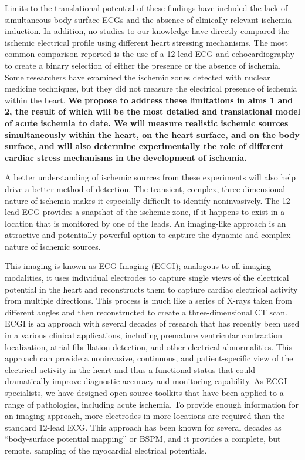 Limits to the translational potential of these findings have included the
lack of simultaneous body-surface ECGs and the absence of clinically
relevant ischemia induction. In addition, no studies to our knowledge have
directly compared the ischemic electrical profile using different heart
stressing mechanisms. The most common comparison reported is the use of a
12-lead ECG and echocardiography to create a binary selection of either the
presence or the absence of
ischemia.\cite{BLZ:Sha1998a,BLZ:Dho2000,BLZ:Mai1994} Some researchers have
examined the ischemic zones detected with nuclear medicine techniques, but
they did not measure the electrical presence of ischemia within the
heart.\cite{BLZ:San1998} \textbf{We propose to address these limitations in
  aims 1 and 2, the result of which will be the most detailed and
  translational model of acute ischemia to date. We will measure realistic
  ischemic sources simultaneously within the heart, on the heart surface,
  and on the body surface, and will also determine experimentally the role
  of different cardiac stress mechanisms in the development of ischemia.}

A better understanding of ischemic sources from these experiments will also
help drive a better method of detection. The transient, complex,
three-dimensional nature of ischemia makes it especially difficult to
identify noninvasively. The 12-lead ECG provides a snapshot of the ischemic
zone, if it happens to exist in a location that is monitored by one of the
leads. An imaging-like approach is an attractive and potentially powerful
option to capture the dynamic and complex nature of ischemic sources.

This imaging is known as ECG Imaging
(ECGI)\cite{RSM:Bro97b,RSM:Pul2010,RSM:Rud2015}; analogous to all imaging
modalities, it uses individual electrodes to capture single views of the
electrical potential in the heart and reconstructs them to capture cardiac
electrical activity from multiple directions.  This process is much like a
series of X-rays taken from different angles and then reconstructed to
create a three-dimensional CT scan. ECGI is an approach with several
decades of research that has recently been used in a various clinical
applications, including premature ventricular contraction localization,
atrial fibrillation detection, and other electrical
abnormalities.\cite{RSM:Sha2015,BLZ:Pot2014,BLZ:Dub2015,BLZ:Wan2016a,RSM:Sha2015,BLZ:Wan2018,RSM:Ost97,RSM:Mac98,RSM:Bro99,RSM:Clu2018,RSM:Clu2015}
This approach can provide a noninvasive, continuous, and patient-specific view of the
electrical activity in the heart and thus a functional status that
could dramatically improve diagnostic accuracy and monitoring capability.
As ECGI specialists, we have designed open-source toolkits that have been
applied to a range of pathologies, including acute
ischemia.\cite{BMB:Mac95,BMB:Bur2011,BMB:Bur2018a,BMB:Bur2018b,BLZ:Tat2018}
To provide enough information for an imaging approach, more electrodes in
more locations are required than the standard 12-lead ECG. This approach
has been known for several decades as ``body-surface potential mapping'' or
BSPM, and it provides a complete, but remote, sampling of the myocardial
electrical potentials. \cite{BLZ:Mil1980,BLZ:Fox1979,BLZ:Hor2001,RSM:Koz95}

